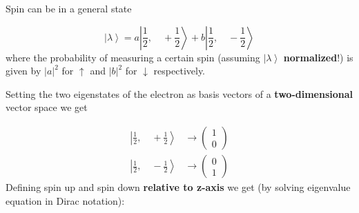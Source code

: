 
Spin can be in a general state

\begin{equation*}
    \left|\lambda\right>=a\left|\frac{1}{2},\quad +\frac{1}{2}\right>+b\left|\frac{1}{2},\quad -\frac{1}{2}\right>
\end{equation*}
where the probability of measuring a certain spin (assuming $\left|\lambda\right>$ \textbf{normalized}!) is given by $|a|^2$ for $\uparrow$ and $|b|^2$ for $\downarrow$ respectively.


Setting the two eigenstates of the electron as basis vectors of a \textbf{two-dimensional} vector space we get

\begin{align*}
    \left|\frac{1}{2},\quad +\frac{1}{2}\right> & \rightarrow \left(\begin{matrix}
                                                                            1 \\
                                                                            0
                                                                        \end{matrix}\right) \\
    \left|\frac{1}{2},\quad -\frac{1}{2}\right> & \rightarrow \left(\begin{matrix}
                                                                            0 \\
                                                                            1
                                                                        \end{matrix}\right)
\end{align*}
Defining spin up and spin down \textbf{relative to z-axis} we get (by solving eigenvalue equation in Dirac notation):
